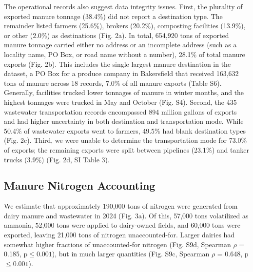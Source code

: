 \documentclass{iopjournal}
\begin{document}
The operational records also suggest data integrity issues. First, the plurality of exported manure tonnage (38.4\%) did not report a destination type. The remainder listed farmers (25.6\%), brokers (20.2\%), composting facilities (13.9\%), or other (2.0\%) as destinations (Fig. 2a). In total, 654,920 tons of exported manure tonnage carried either no address or an incomplete address (such as a locality name, PO Box, or road name without a number),  28.1\% of total manure exports (Fig. 2b). This includes the single largest manure destination in the dataset, a PO Box for a produce company in Bakersfield that received 163,632 tons of manure across 18 records, 7.0\% of all manure exports (Table S6). Generally, facilities trucked lower tonnages of manure in winter months, and the highest tonnages were trucked in May and October (Fig. S4). Second, the 435 wastewater transportation records encompassed 894 million gallons of exports and had higher uncertainty in both destination and transportation mode. While 50.4\% of wastewater exports went to farmers, 49.5\% had blank destination types (Fig. 2c). Third, we were unable to determine the transportation mode for 73.0\% of exports; the remaining exports were split between pipelines (23.1\%) and tanker trucks (3.9\%) (Fig. 2d, SI Table 3).


\subsection{Manure Nitrogen Accounting}

We estimate that approximately 190,000 tons of nitrogen were generated from dairy manure and wastewater in 2024 (Fig. 3a). Of this, 57,000 tons volatilized as ammonia, 52,000 tons were applied to dairy-owned fields, and 60,000 tons were exported, leaving 21,000 tons of nitrogen unaccounted-for. Larger dairies had somewhat higher fractions of unaccounted-for nitrogen (Fig. S9d, Spearman $\rho$ = 0.185, p$\leq0.001$), but in much larger quantities (Fig. S9c, Spearman $\rho$ = 0.648, p$\leq0.001$). 
\end{document}
